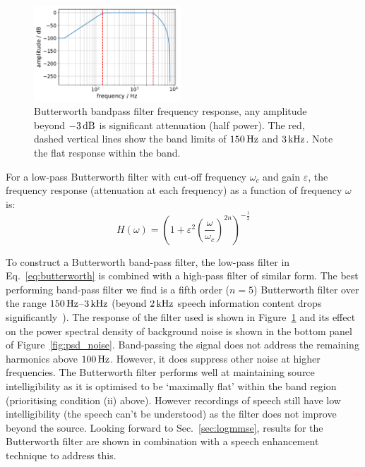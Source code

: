 \documentclass[paper-main.tex]{subfiles}
\begin{document}


\begin{figure}
	\includegraphics[width=0.49\textwidth]{figures/butterworth_150_3000.pdf}
	\caption{Butterworth bandpass filter frequency response, any amplitude beyond $-3\,{\rm dB}$ is significant attenuation (half power). The red, dashed vertical lines show the band limits of $150\,{\rm Hz}$ and $3\,{\rm kHz}$. Note the flat response within the band.}
	\label{fig:butterworth}
\end{figure}

For a low-pass Butterworth filter with cut-off frequency $\omega_c$ and gain $\varepsilon$, the frequency response (attenuation at each frequency) as a function of frequency $\omega$ is:
\begin{equation}
\label{eq:butterworth}
H(\omega) = \left(1+\varepsilon^2 \left( \frac{\omega}{\omega_c} \right)^{2n}\right)^{-\frac{1}{2}}
\end{equation}

To construct a Butterworth band-pass filter, the low-pass filter in Eq.~\ref{eq:butterworth} is combined with a high-pass filter of similar form. 
The best performing band-pass filter we find is a fifth order ($n = 5$) Butterworth filter over the range $150\,{\rm Hz}$--$3\,{\rm kHz}$ (beyond $2\,{\rm kHz}$ speech information content drops significantly~\cite{speech_intelligibility}). 
The response of the filter used is shown in Figure~\ref{fig:butterworth} and its effect on the power spectral density of background noise is shown in the bottom panel of Figure~\ref{fig:psd_noise}.
Band-passing the signal does not address the remaining harmonics above $100\,{\rm Hz}$. 
However, it does suppress other noise at higher frequencies. 
The Butterworth filter performs well at maintaining source intelligibility as it is optimised to be `maximally flat' within the band region (prioritising condition (ii) above).
However recordings of speech still have low intelligibility (the speech can't be understood) as the filter does not improve beyond the source.
Looking forward to Sec.~\ref{sec:logmmse}, results for the Butterworth filter are shown in combination with a speech enhancement technique to address this. 
\end{document}
